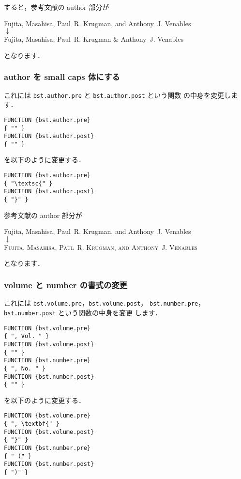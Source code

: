 \documentclass[article]{jlreq}
\begin{document}
すると，参考文献の author 部分が
\begin{center}
Fujita, Masahisa, Paul~R. Krugman, and Anthony~J. Venables \\
 $\downarrow$ \\
Fujita, Masahisa, Paul~R. Krugman \& Anthony~J. Venables 
\end{center}
となります．

\subsubsection{author を small caps 体にする}

これには \texttt{bst.author.pre} と \texttt{bst.author.post} という関数
の中身を変更します．

\begin{screen}
\begin{verbatim}
FUNCTION {bst.author.pre}
{ "" }
FUNCTION {bst.author.post}
{ "" }
\end{verbatim}
\end{screen}
を以下のように変更する．
\begin{screen}
\begin{verbatim}
FUNCTION {bst.author.pre}
{ "\textsc{" }
FUNCTION {bst.author.post}
{ "}" }
\end{verbatim}
\end{screen}

参考文献の author 部分が
\begin{center}
Fujita, Masahisa, Paul~R. Krugman, and Anthony~J. Venables \\
 $\downarrow$ \\
\textsc{Fujita, Masahisa, Paul~R. Krugman, and Anthony~J. Venables}
\end{center}
となります．

\subsubsection{volume と number の書式の変更}

これには \texttt{bst.volume.pre}，\texttt{bst.volume.post}，
\texttt{bst.number.pre}，\texttt{bst.number.post} という関数の中身を変更
します．

\begin{screen}
\begin{verbatim}
FUNCTION {bst.volume.pre}
{ ", Vol. " }
FUNCTION {bst.volume.post}
{ "" }
FUNCTION {bst.number.pre}
{ ", No. " }
FUNCTION {bst.number.post}
{ "" }
\end{verbatim}
\end{screen}
を以下のように変更する．
\begin{screen}
\begin{verbatim}
FUNCTION {bst.volume.pre}
{ ", \textbf{" }
FUNCTION {bst.volume.post}
{ "}" }
FUNCTION {bst.number.pre}
{ " (" }
FUNCTION {bst.number.post}
{ ")" }
\end{verbatim}
\end{screen}
\end{document}
